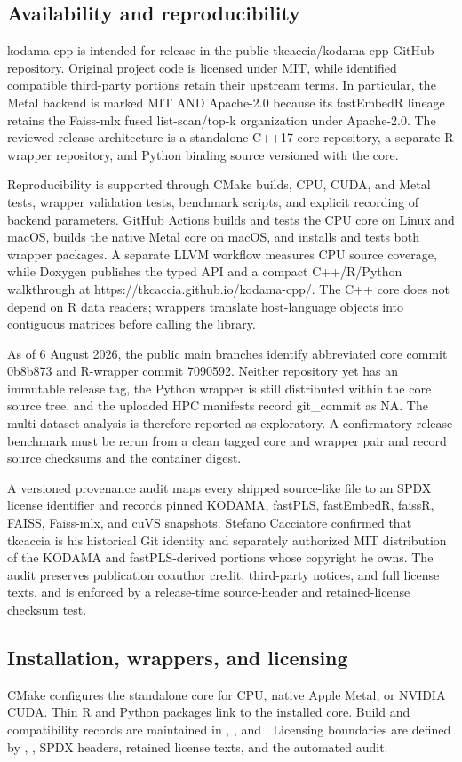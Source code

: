 \documentclass[twoside,11pt]{article}
\begin{document}
\begin{small}
\section{Availability and reproducibility}
kodama-cpp is intended for release in the public tkcaccia/kodama-cpp GitHub repository. Original project code is licensed under MIT, while identified compatible third-party portions retain their upstream terms. In particular, the Metal backend is marked MIT AND Apache-2.0 because its fastEmbedR lineage retains the Faiss-mlx fused list-scan/top-k organization under Apache-2.0. The reviewed release architecture is a standalone C++17 core repository, a separate R wrapper repository, and Python binding source versioned with the core.

Reproducibility is supported through CMake builds, CPU, CUDA, and Metal tests, wrapper validation tests, benchmark scripts, and explicit recording of backend parameters. GitHub Actions builds and tests the CPU core on Linux and macOS, builds the native Metal core on macOS, and installs and tests both wrapper packages. A separate LLVM workflow measures CPU source coverage, while Doxygen publishes the typed API and a compact C++/R/Python walkthrough at https://tkcaccia.github.io/kodama-cpp/. The C++ core does not depend on R data readers; wrappers translate host-language objects into contiguous matrices before calling the library.

As of 6 August 2026, the public main branches identify abbreviated core commit 0b8b873 and R-wrapper commit 7090592. Neither repository yet has an immutable release tag, the Python wrapper is still distributed within the core source tree, and the uploaded HPC manifests record git\_commit as NA. The multi-dataset analysis is therefore reported as exploratory. A confirmatory release benchmark must be rerun from a clean tagged core and wrapper pair and record source checksums and the container digest.

A versioned provenance audit maps every shipped source-like file to an SPDX license identifier and records pinned KODAMA, fastPLS, fastEmbedR, faissR, FAISS, Faiss-mlx, and cuVS snapshots. Stefano Cacciatore confirmed that tkcaccia is his historical Git identity and separately authorized MIT distribution of the KODAMA and fastPLS-derived portions whose copyright he owns. The audit preserves publication coauthor credit, third-party notices, and full license texts, and is enforced by a release-time source-header and retained-license checksum test.

\subsection{Installation, wrappers, and licensing}
CMake configures the standalone core for CPU, native Apple Metal, or NVIDIA CUDA. Thin R and Python packages link to the installed core. Build and compatibility records are maintained in , , and . Licensing boundaries are defined by , , SPDX headers, retained license texts, and the automated audit.


\end{small}
\end{document}
